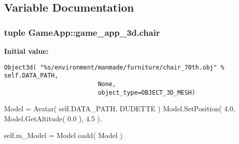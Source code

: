 \subsection{Variable Documentation}
\hypertarget{namespaceGameApp_1_1game__app__3d_e874969777b925453b3bfc5ba3b0bd59}{
\subsubsection[chair]{\setlength{\rightskip}{0pt plus 5cm}tuple {\bf GameApp::game\_\-app\_\-3d.chair}}}
\label{namespaceGameApp_1_1game__app__3d_e874969777b925453b3bfc5ba3b0bd59}


\textbf{Initial value:}

\begin{Code}\begin{verbatim}Object3d( "%s/environment/manmade/furniture/chair_70th.obj" % self.DATA_PATH, 
                          None, 
                          object_type=OBJECT_3D_MESH)
\end{verbatim}
\end{Code}
Model = Avatar( self.DATA\_\-PATH, DUDETTE ) Model.SetPosition( 4.0, Model.GetAltitude( 0.0 ), 4.5 ). 

self.m\_\-Model = Model oadd( Model ) 